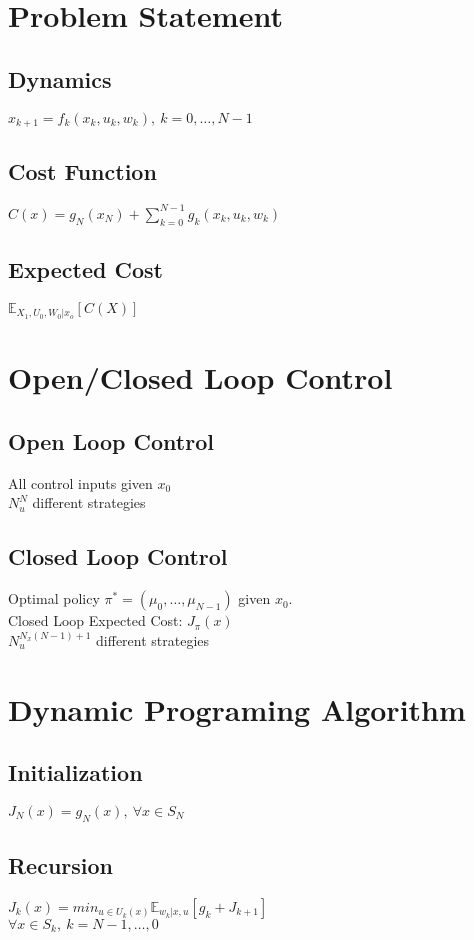 \section*{Problem Statement}
\subsection*{Dynamics}
$x_{k+1} = f_k(x_k, u_k, w_k),\ k=0,\dots,N-1$
\subsection*{Cost Function}
$C(x) = g_N(x_N) + \sum_{k=0}^{N-1}g_k(x_k,u_k,w_k)$
\subsection*{Expected Cost}
$\mathbb{E}_{X_1,U_0,W_0|x_o}[C(X)]$

\section*{Open/Closed Loop Control}
\subsection*{Open Loop Control}
All control inputs given $x_0$\\
$N_u^N$ different strategies
\subsection*{Closed Loop Control}
Optimal policy $\pi^* = (\mu_0,\dots,\mu_{N-1})$ given $x_0$.\\
Closed Loop Expected Cost: $J_{\pi}(x)$ \\
$N_u^{N_x(N-1)+1}$ different strategies

\section*{Dynamic Programing Algorithm}
\subsection*{Initialization}
$J_N(x) = g_N(x),\ \forall x \in S_N$
\subsection*{Recursion}
$J_k(x) = min_{u\in U_k(x)} \mathbb{E}_{w_k|x, u}[g_k + J_{k+1}]$\\
$\forall x \in S_k, \ k = N-1, \dots, 0$


